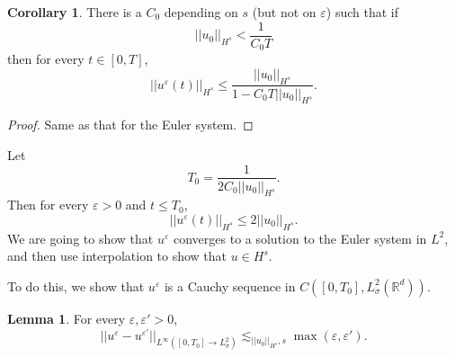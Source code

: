 \documentclass[12pt]{book}
\newcommand{\RR}{\mathbb{R}}
\theoremstyle{definition}
\newtheorem{lemma}[theorem]{Lemma}
\newtheorem{corollary}[theorem]{Corollary}
\begin{document}
\begin{corollary}
There is a $C_0$ depending on $s$ (but not on $\varepsilon$) such that if
$$||u_0||_{H^s} < \frac{1}{C_0T}$$
then for every $t \in [0, T]$,
$$||u^\varepsilon(t)||_{H^s} \leq \frac{||u_0||_{H^s}}{1 - C_0T ||u_0||_{H^s}}.$$
\end{corollary}
\begin{proof}
Same as that for the Euler system.
\end{proof}

Let
$$T_0 = \frac{1}{2C_0||u_0||_{H^s}}.$$
Then for every $\varepsilon > 0$ and $t \leq T_0$,
$$||u^\varepsilon(t)||_{H^s} \leq 2||u_0||_{H^s}.$$
We are going to show that $u^\varepsilon$ converges to a solution to the Euler system in $L^2$, and then use interpolation to show that $u \in H^s$.

To do this, we show that $u^\varepsilon$ is a Cauchy sequence in $C([0, T_0], L^2_\sigma(\RR^d))$.
\begin{lemma}
For every $\varepsilon, \varepsilon' > 0$,
$$||u^\varepsilon - u^{\varepsilon'}||_{L^\infty([0, T_0] \to L^2_\sigma)} \lesssim_{||u_0||_{H^s},s} \max(\varepsilon, \varepsilon').$$
\end{lemma}
\end{document}
